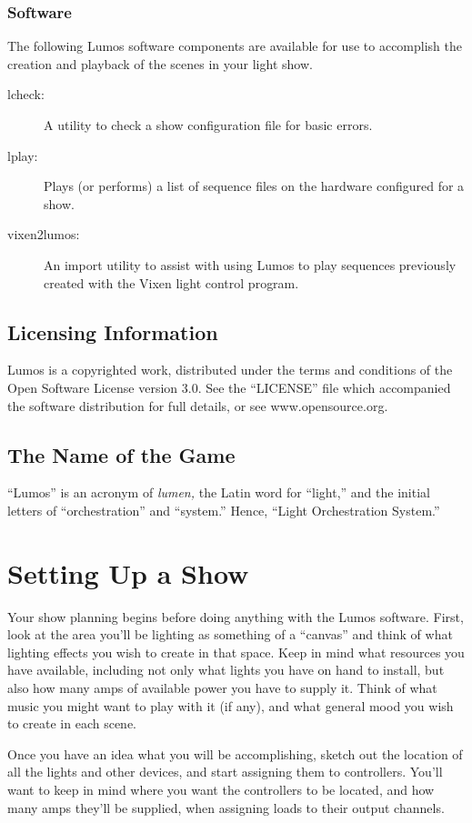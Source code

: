 \documentclass{article}
\begin{document}
\subsubsection{Software}
The following Lumos software components are available for use to accomplish
the creation and playback of the scenes in your light show.
\begin{description}
	\item[lcheck:]
		A utility to check a show configuration file for basic errors.
	\item[lplay:]
		Plays (or performs) a list of sequence files on the hardware
		configured for a show.
	\item[vixen2lumos:]
		An import utility to assist with using Lumos to play sequences
		previously created with the Vixen light control program.
\end{description}

\subsection{Licensing Information}
Lumos is a copyrighted work, distributed under the terms and conditions of the 
Open Software License version 3.0.  See the ``LICENSE'' file which accompanied
the software distribution for full details, or see www.opensource.org.

\subsection{The Name of the Game}
``Lumos'' is an acronym of {\em lumen,\/} the Latin word for ``light,'' and
the initial letters of ``orchestration'' and ``system.''  Hence, ``Light
Orchestration System.''

\section{Setting Up a Show}
Your show planning begins before doing anything with the Lumos software.
First, look at the area you'll be lighting as something of a ``canvas'' and
think of what lighting effects you wish to create in that space.  Keep in mind
what resources you have available, including not only what lights you have on
hand to install, but also how many amps of available power you have to supply
it.  Think of what music you might want to play with it (if any), and what
general mood you wish to create in each scene.

Once you have an idea what you will be accomplishing, sketch out the location
of all the lights and other devices, and start assigning them to controllers.
You'll want to keep in mind where you want the controllers to be located, and
how many amps they'll be supplied, when assigning loads to their output
channels.
\end{document}
